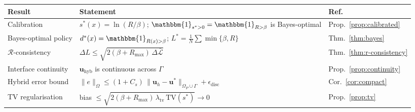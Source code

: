 \documentclass[11pt]{article}
\newcommand{\Lcal}{\mathcal{L}}
\newcommand{\Rcal}{\mathcal{R}}
\newcommand{\TV}{\mathrm{TV}}
\newcommand{\ind}{\mathbbm{1}}
\begin{document}
\begin{center}
\renewcommand{\arraystretch}{1.5}
\begin{tabular}{lll}
\hline
\textbf{Result} & \textbf{Statement} & \textbf{Ref.} \\
\hline
Calibration
  & $s^*(x) = \ln(R/\beta)$;\; $\ind_{s^* > 0} = \ind_{R > \beta}$ is Bayes-optimal
  & Prop.~\ref{prop:calibrated} \\
Bayes-optimal policy
  & $d^*(x) = \ind_{R(x) > \beta}$;\;
    $L^* = \frac{1}{N}\sum \min\{\beta, R\}$
  & Thm.~\ref{thm:bayes} \\
$\Rcal$-consistency
  & $\Delta L \le \sqrt{2(\beta + R_{\max})\,\Delta\bar{\Lcal}}$
  & Thm.~\ref{thm:r-consistency} \\
Interface continuity
  & $\mathbf{u}_{\mathrm{hyb}}$ is continuous across $\Gamma$
  & Prop.~\ref{prop:continuity} \\
Hybrid error bound
  & $\|e\|_\Omega \le (1{+}C_s)\,\|\mathbf{u}_h - \mathbf{u}^*\|_{\Omega_P \cup \Gamma}
    + \epsilon_{\mathrm{disc}}$
  & Cor.~\ref{cor:compact} \\
TV regularisation
  & bias $\le \sqrt{2(\beta + R_{\max})\,\lambda_{\mathrm{tv}}\,\TV(s^*)} \to 0$
  & Prop.~\ref{prop:tv} \\
\hline
\end{tabular}
\end{center}

\medskip
\end{document}
